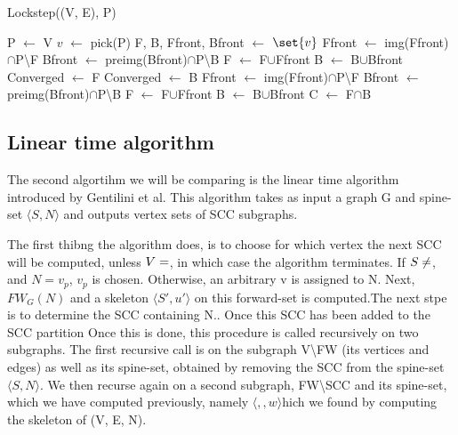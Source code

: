 \documentclass[../master/master.tex]{subfiles}
\newcommand{\FW}[2][G]{\ensuremath{FW_{#1}(#2)}}
\newcommand{\pair}[2]{\ensuremath{\langle #1, #2\rangle}}
\newcommand*\Let[2]{\State #1 $\gets$ #2}
\begin{document}
\begin{algorithm}
  \caption{Lockstep((V, E), P)}
  \begin{algorithmic}[1]
    \Let{P}{V}
    \Statex
    \State \Return
    \EndIf
    \Statex
      \Let{$v$}{pick(P)}
      \Let{F, B, Ffront, Bfront}{$\set{v}$}
      \Statex
      \Let{Ffront}{img(Ffront)$\cap$P\textbackslash F}
      \Let{Bfront}{preimg(Bfront)$\cap$P\textbackslash B}
      \Let{F}{F$\cup$Ffront}
       \Let{B}{B$\cup$Bfront}
       \EndWhile
       \Statex
        \Let{Converged}{F}
        \Else
        \Let{Converged}{B}
          \EndIf
      \Statex
       \Let{Ffront}{img(Ffront)$\cap$P\textbackslash F}
       \Let{Bfront}{preimg(Bfront)$\cap$P\textbackslash B}
       \Let{F}{F$\cup$Ffront}
       \Let{B}{B$\cup$Bfront}
       \EndWhile
       \Statex
       \Let{C}{F$\cap$B}
  \end{algorithmic}
\end{algorithm}
\subsection{Linear time algorithm}
The second algortihm we will be comparing is the linear time algorithm \cite{linear} introduced by Gentilini et al. This algorithm takes as input a graph G and spine-set $\langle S, N\rangle$ and outputs vertex sets of SCC subgraphs.

The first thibng the algorithm does, is to choose for which vertex the next SCC will be computed, unless $V=\empty$, in which case the algorithm terminates. If $S\neq\empty$, and $N={v_p}$, $v_p$ is chosen. Otherwise, an arbitrary v is assigned to N. Next, \FW{N} and a skeleton \pair{S'}{u'} on this forward-set is computed.The next stpe is to determine the SCC containing N.. Once this SCC has been added to the SCC partition 
Once this is done, this procedure is called recursively on two subgraphs. The first recursive call is on the subgraph V\textbackslash FW (its vertices and edges) as well as its spine-set, obtained by removing the SCC from the spine-set $\langle S, N\rangle$. We then recurse again on a second subgraph, FW\textbackslash SCC and its spine-set, which we have computed previously, namely \pair, which we found by computing the skeleton of (V, E, N).

\end{document}
